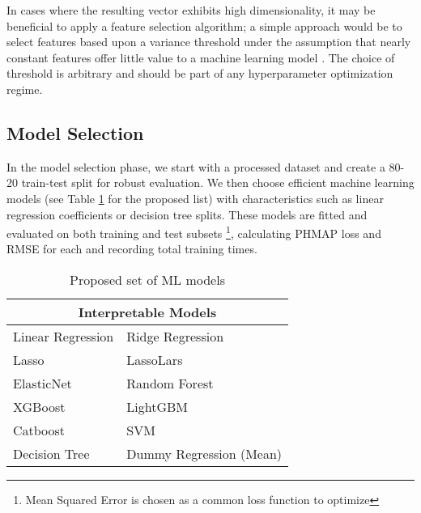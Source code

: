 \documentclass{IEEEtran}
\begin{document}
                In cases where the resulting vector exhibits high dimensionality, it may be beneficial to apply a feature selection algorithm; a simple approach would be to select features based upon a variance threshold under the assumption that nearly constant features offer little value to a machine learning model \cite{li2017feature}. The choice of threshold is arbitrary and should be part of any hyperparameter optimization regime.

        \subsection{Model Selection} \label{sec:model}

            In the model selection phase, we start with a processed dataset and create a 80-20 train-test split for robust evaluation. We then choose efficient machine learning models (see Table \ref{tab:interpretable_models} for the proposed list) with characteristics such as linear regression coefficients or decision tree splits. These models are fitted and evaluated on both training and test subsets \footnote{Mean Squared Error is chosen as a common loss function to optimize}, calculating PHMAP loss and RMSE for each and recording total training times.
            \begin{table}[!htbp]
                \centering
                \caption{Proposed set of ML models}
                \label{tab:interpretable_models}
                \begin{tabular}{ll}
                    \toprule
                    \multicolumn{2}{c}{Interpretable Models} \\
                    \midrule
                    Linear Regression \cite{scikit-learn} & Ridge Regression \cite{scikit-learn}\\
                    Lasso \cite{scikit-learn} & LassoLars \cite{scikit-learn} \\
                    ElasticNet \cite{scikit-learn} & Random Forest \cite{scikit-learn} \\
                    XGBoost \cite{xgboost} & LightGBM \cite{ke2017lightgbm} \\
                    Catboost \cite{catboost} & SVM \cite{scikit-learn} \\
                    Decision Tree \cite{scikit-learn}& Dummy Regression (Mean) \cite{scikit-learn} \\
                    \bottomrule
                \end{tabular}
            \end{table}
\end{document}
